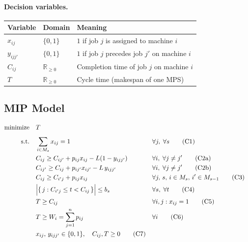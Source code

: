 \documentclass[11pt,a4paper]{article}
\begin{document}
\paragraph{Decision variables.}
\begin{table}[h!]
\centering
\begin{tabular}{@{}lll@{}}
\toprule
Variable & Domain & Meaning \\
\midrule
$x_{ij}$ & $\{0,1\}$ & $1$ if job $j$ is assigned to machine $i$ \\
$y_{ijj'}$ & $\{0,1\}$ & $1$ if job $j$ precedes job $j'$ on machine $i$ \\
$C_{ij}$ & $\mathbb{R}_{\ge 0}$ & Completion time of job $j$ on machine $i$ \\
$T$ & $\mathbb{R}_{\ge 0}$ & Cycle time (makespan of one MPS) \\
\bottomrule
\end{tabular}
\end{table}

\subsection{MIP Model}

\begin{align}
  \text{minimize} \quad & T \label{eq:obj}\\[4pt]
  \text{s.t.}\quad
  &\sum_{i \in M_s} x_{ij} = 1
    && \forall j,\; \forall s \tag{C1}\label{eq:c1}\\
  &C_{ij} \ge C_{ij'} + p_{ij} x_{ij} - L(1 - y_{ijj'})
    && \forall i,\; \forall j \neq j' \tag{C2a}\label{eq:c2a}\\
  &C_{ij'} \ge C_{ij} + p_{ij'} x_{ij'} - L\, y_{ijj'}
    && \forall i,\; \forall j \neq j' \tag{C2b}\label{eq:c2b}\\
  &C_{ij} \ge C_{i'j} + p_{ij} x_{ij}
    && \forall j,\, s,\, i \in M_s,\, i' \in M_{s-1} \tag{C3}\label{eq:c3}\\
  &\Bigl|\{\, j : C_{i'j} \le t < C_{ij} \,\}\Bigr| \le b_s
    && \forall s,\; \forall t \tag{C4}\label{eq:c4}\\
  &T \ge C_{ij}
    && \forall i,j : x_{ij}=1 \tag{C5}\label{eq:c5}\\
  &T \ge W_i = \sum_{j=1}^{n} p_{ij}
    && \forall i \tag{C6}\label{eq:c6}\\
  &x_{ij},\, y_{ijj'} \in \{0,1\},\quad C_{ij}, T \ge 0 \tag{C7}\label{eq:c7}
\end{align}
\end{document}
